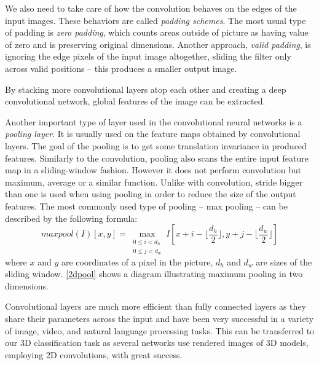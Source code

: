 

We also need to take care of how the convolution behaves on the edges of the input images. These behaviors are called \textit{padding schemes}. The most usual type of padding is \textit{zero padding}, which counts areas outside of picture as having value of zero and is preserving original dimensions. Another approach, \textit{valid padding}, is ignoring the edge pixels of the input image altogether, sliding the filter only across valid positions -- this produces a smaller output image. \par
By stacking more convolutional layers atop each other and creating a deep convolutional network,  global features of the image can be extracted. 
\par
Another important type of layer used in the convolutional neural networks is a \textit{pooling layer}. It is usually used on the feature maps obtained by convolutional layers. The goal of the pooling is to get some translation invariance in produced features. Similarly to the convolution, pooling also scans the entire input feature map in a sliding-window fashion. However it does not perform convolution but maximum, average or a similar function. Unlike with convolution, stride bigger than one is used when using pooling in order to reduce the size of the output features.
The most commonly used type of pooling -- max pooling -- can be described by the following formula: 
$$maxpool(I)[x,y] =
\max_{\substack{0 \leq i < d_h\\
		0 \leq j < d_w}}
I[x + i - \lfloor \frac{d_h}{2} \rfloor, y + j - \lfloor \frac{d_w}{2}  \rfloor ] $$ where $x$ and $y$ are coordinates of a pixel in the picture, $d_h$ and $d_w$ are sizes of the sliding window. \autoref{2dpool} shows a diagram illustrating maximum pooling in two dimensions.\par
Convolutional layers are much more efficient than fully connected layers as they share their parameters across the input and have been very successful in a variety of image, video, and natural language processing tasks. This  can be transferred to our 3D classification task as several networks use rendered images of 3D models, employing 2D convolutions, with great success. 



